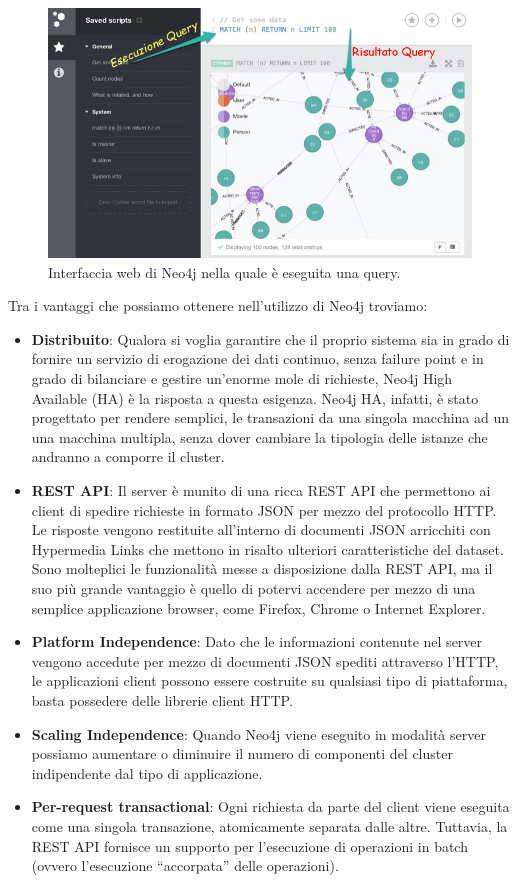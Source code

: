 \begin{figure}[H]
	\centering
	\includegraphics[width=\textwidth, height=0.35\textheight, keepaspectratio]{images/neo4jWebPage.png}
	\caption{Interfaccia web di Neo4j nella quale è eseguita una query.}
	\label{fig:Neo4jWebPage}
\end{figure}
Tra i vantaggi che possiamo ottenere nell'utilizzo di Neo4j troviamo:
\begin{itemize}
\item \textbf{Distribuito}: Qualora si voglia garantire che il proprio sistema sia in grado di fornire un servizio di erogazione dei dati continuo, senza failure point e in grado di bilanciare e gestire un'enorme mole di richieste, Neo4j High Available (HA) è la risposta a questa esigenza. Neo4j HA, infatti, è stato progettato per rendere semplici, le transazioni da una singola macchina ad un una macchina multipla, senza dover cambiare la tipologia delle istanze che andranno a comporre il cluster.
\item \textbf{REST API}: Il server è munito di una ricca REST API che permettono ai client di spedire richieste in formato JSON per mezzo del protocollo HTTP. Le risposte vengono restituite all'interno di documenti JSON arricchiti con Hypermedia Links che mettono in risalto ulteriori caratteristiche del dataset. Sono molteplici le funzionalità messe a disposizione dalla REST API, ma il suo più grande vantaggio è quello di potervi accendere per mezzo di una semplice applicazione browser, come Firefox, Chrome o Internet Explorer.
\item \textbf{Platform Independence}: Dato che le informazioni contenute nel server vengono accedute per mezzo di documenti JSON spediti attraverso l’HTTP, le applicazioni client possono essere costruite su qualsiasi tipo di piattaforma, basta possedere delle librerie client HTTP.
\item \textbf{Scaling Independence}: Quando Neo4j viene eseguito in modalità server possiamo aumentare o diminuire il numero di componenti del cluster indipendente dal tipo di applicazione.
\item \textbf{Per-request transactional}: Ogni richiesta da parte del client viene eseguita come una singola transazione, atomicamente separata dalle altre. Tuttavia, la REST API fornisce un supporto per l'esecuzione di operazioni in batch (ovvero l'esecuzione “accorpata” delle operazioni). 
\end{itemize}
